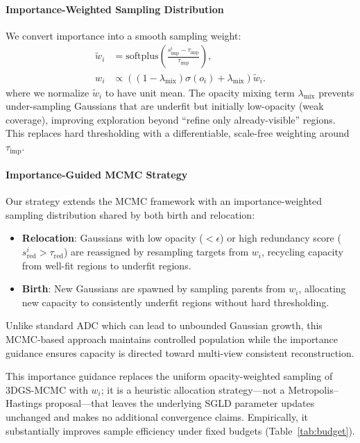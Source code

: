 \documentclass[sigconf]{acmart}
\begin{document}
\paragraph{Importance-Weighted Sampling Distribution}
We convert importance into a smooth sampling weight:
\begin{equation}
    \begin{aligned}
    \tilde{w}_i &= \mathrm{softplus}\left(\frac{s^i_{\text{imp}}-\tau_{\text{imp}}}{\tau_{\text{imp}}}\right),\\
    w_i &\propto \left((1-\lambda_{\text{mix}})\sigma(o_i)+\lambda_{\text{mix}}\right)\tilde{w}_i.
    \end{aligned}
\end{equation}
where we normalize $\tilde{w}_i$ to have unit mean. The opacity mixing term $\lambda_{\text{mix}}$ prevents under-sampling Gaussians that are underfit but initially low-opacity (weak coverage), improving exploration beyond ``refine only already-visible'' regions. This replaces hard thresholding with a differentiable, scale-free weighting around $\tau_{\text{imp}}$.

\paragraph{Importance-Guided MCMC Strategy}
Our strategy extends the MCMC framework with an importance-weighted sampling distribution shared by both birth and relocation:
\begin{itemize}
    \item \textbf{Relocation}: Gaussians with low opacity ($< \epsilon$) or high redundancy score ($s^i_{\text{red}} > \tau_{\text{red}}$) are reassigned by resampling targets from $w_i$, recycling capacity from well-fit regions to underfit regions.
    \item \textbf{Birth}: New Gaussians are spawned by sampling parents from $w_i$, allocating new capacity to consistently underfit regions without hard thresholding.
\end{itemize}
Unlike standard ADC which can lead to unbounded Gaussian growth, this MCMC-based approach maintains controlled population while the importance guidance ensures capacity is directed toward multi-view consistent reconstruction.

This importance guidance replaces the uniform opacity-weighted sampling of 3DGS-MCMC with $w_i$; it is a heuristic allocation strategy---not a Metropolis--Hastings proposal---that leaves the underlying SGLD parameter updates unchanged and makes no additional convergence claims. Empirically, it substantially improves sample efficiency under fixed budgets (Table~\ref{tab:budget}).
\end{document}
